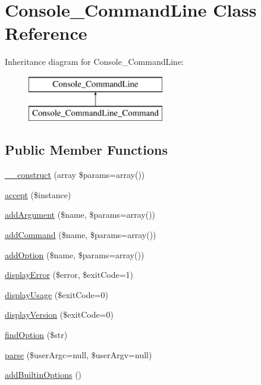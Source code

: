 \hypertarget{class_console___command_line}{
\section{Console\_\-CommandLine Class Reference}
\label{class_console___command_line}
}
Inheritance diagram for Console\_\-CommandLine:\begin{figure}[H]
\begin{center}
\leavevmode
\includegraphics[height=2.000000cm]{class_console___command_line}
\end{center}
\end{figure}
\subsection*{Public Member Functions}
\begin{DoxyCompactItemize}
\item 
\hyperlink{class_console___command_line_a85ac5b7f54ad67ec6b5b9dc282717602}{\_\-\_\-construct} (array \$params=array())
\item 
\hyperlink{class_console___command_line_acbe2cdb774d2e2eed0c02eda2b7dcc85}{accept} (\$instance)
\item 
\hyperlink{class_console___command_line_a7111cf9f2fcff74b790f20a95b4b2bbe}{addArgument} (\$name, \$params=array())
\item 
\hyperlink{class_console___command_line_a754d690981c63bcecf9e32d96596cfed}{addCommand} (\$name, \$params=array())
\item 
\hyperlink{class_console___command_line_a03cc4ebc43ebb304d79fc731c73c7d5d}{addOption} (\$name, \$params=array())
\item 
\hyperlink{class_console___command_line_ad9e5386ec285042822c328183f0a0e53}{displayError} (\$error, \$exitCode=1)
\item 
\hyperlink{class_console___command_line_ade9e55935bd80bdfb3b6ebf972e1922d}{displayUsage} (\$exitCode=0)
\item 
\hyperlink{class_console___command_line_a620a8400449f7d731dc20ed9846e610e}{displayVersion} (\$exitCode=0)
\item 
\hyperlink{class_console___command_line_a53158a104942261940de1d02b947695d}{findOption} (\$str)
\item 
\hyperlink{class_console___command_line_abbb06a97b917ba9cef5341add43f8634}{parse} (\$userArgc=null, \$userArgv=null)
\item 
\hyperlink{class_console___command_line_ad32057b96795668953b8e8c3397d6a90}{addBuiltinOptions} ()
\end{DoxyCompactItemize}
